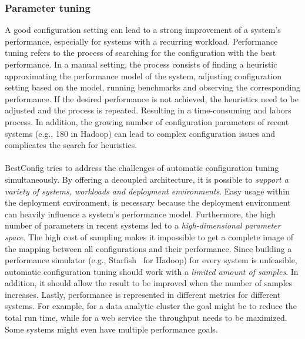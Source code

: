 \subsubsection{Parameter tuning}
A good configuration setting can lead to a strong improvement of a system's performance, especially for systems with a recurring workload. Performance tuning refers to the process of searching for the configuration with the best performance. In a manual setting, the process consists of finding a heuristic approximating the performance model of the system, adjusting configuration setting based on the model, running benchmarks and observing the corresponding performance. If the desired performance is not achieved, the heuristics need to be adjusted and the process is repeated. Resulting in a time-consuming and labors process. In addition, the growing number of configuration parameters  of recent systems (e.g., 180 in Hadoop) can lead to complex configuration issues and complicates the search for heuristics.~\cite{zhu2017bestconfig}\\\\
\noindent BestConfig tries to address the challenges of automatic configuration tuning simultaneously. By offering a decoupled architecture, it is possible to \textit{support a variety of systems, workloads and deployment environments}. Easy usage within the deployment environment, is necessary because the deployment environment can  heavily influence a system's performance model. Furthermore, the high number of parameters in recent systems led to a \textit{high-dimensional parameter space}. The high cost of sampling makes it impossible to get a complete image of the mapping between all configurations and their performance. Since building a performance simulator (e.g., Starfish~\cite{herodotou2011starfish} for Hadoop) for every system is unfeasible, automatic configuration tuning should work with a \textit{limited amount of samples}. In addition,  it should allow the result to be improved when the number of samples increases. Lastly, performance is represented in different metrics for different systems. For example, for a data analytic cluster  the goal might be to reduce the total run time, while for a web service the throughput needs to be maximized. Some systems might even have multiple performance goals.~\cite{zhu2017bestconfig}
